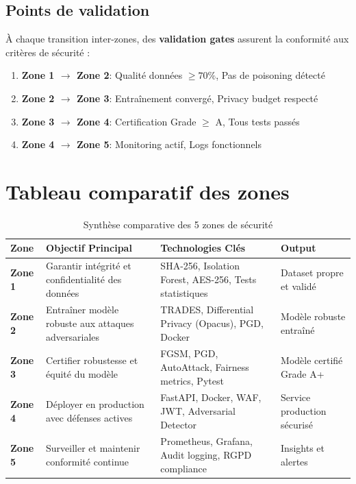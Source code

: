 \documentclass[11pt,a4paper]{article}
\begin{document}
\subsection{Points de validation}

À chaque transition inter-zones, des \textbf{validation gates} assurent la conformité aux critères de sécurité :

\begin{enumerate}
    \item \textbf{Zone 1 $\rightarrow$ Zone 2}: Qualité données $\geq 70\%$, Pas de poisoning détecté
    \item \textbf{Zone 2 $\rightarrow$ Zone 3}: Entraînement convergé, Privacy budget respecté
    \item \textbf{Zone 3 $\rightarrow$ Zone 4}: Certification Grade $\geq$ A, Tous tests passés
    \item \textbf{Zone 4 $\rightarrow$ Zone 5}: Monitoring actif, Logs fonctionnels
\end{enumerate}

\newpage

\section{Tableau comparatif des zones}

\begin{table}[h!]
\centering
\caption{Synthèse comparative des 5 zones de sécurité}
\label{tab:zones_comparison}
\scriptsize
\begin{tabularx}{\textwidth}{|l|X|X|X|}
\hline
\textbf{Zone} & \textbf{Objectif Principal} & \textbf{Technologies Clés} & \textbf{Output} \\ \hline
\rowcolor{zone1color!10}
\textbf{Zone 1} & Garantir intégrité et confidentialité des données & SHA-256, Isolation Forest, AES-256, Tests statistiques & Dataset propre et validé \\ \hline
\rowcolor{zone2color!10}
\textbf{Zone 2} & Entraîner modèle robuste aux attaques adversariales & TRADES, Differential Privacy (Opacus), PGD, Docker & Modèle robuste entraîné \\ \hline
\rowcolor{zone3color!10}
\textbf{Zone 3} & Certifier robustesse et équité du modèle & FGSM, PGD, AutoAttack, Fairness metrics, Pytest & Modèle certifié Grade A+ \\ \hline
\rowcolor{zone4color!10}
\textbf{Zone 4} & Déployer en production avec défenses actives & FastAPI, Docker, WAF, JWT, Adversarial Detector & Service production sécurisé \\ \hline
\rowcolor{zone5color!10}
\textbf{Zone 5} & Surveiller et maintenir conformité continue & Prometheus, Grafana, Audit logging, RGPD compliance & Insights et alertes \\ \hline
\end{tabularx}
\end{table}
\end{document}
